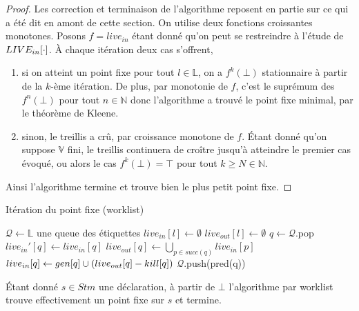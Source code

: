 \documentclass[a4paper, 10pt]{article}
\begin{document}
\begin{proof}
Les correction et terminaison de l'algorithme reposent en partie sur ce qui a été dit en amont de cette section.
On utilise deux fonctions croissantes monotones. Posons $f = live_{in}$ étant donné qu'on peut se restreindre
à l'étude de $LIVE_{in}[\cdot]$. À chaque itération deux cas s'offrent,
\begin{enumerate}
	\item si on atteint un point fixe pour tout $l \in \mathbb{L}$, on a $f^k(\bot)$ stationnaire
	à partir de la $k$-ème itération. De plus, par monotonie de $f$, c'est le suprémum des $f^n(\bot)$ pour tout $n \in \mathbb{N}$ donc
	l'algorithme a trouvé le point fixe minimal, par le théorème de Kleene.
	\item sinon, le treillis a crû, par croissance monotone de $f$. Étant donné qu'on suppose $\mathbb{V}$ fini, le treillis continuera
	de croître jusqu'à atteindre le premier cas évoqué, ou alors le cas $f^k(\bot) = \top$ pour tout $k \ge N \in \mathbb{N}$.
\end{enumerate}
Ainsi l'algorithme termine et trouve bien le plus petit point fixe.
\end{proof}
\begin{algorithm}[H]
	\caption{Itération du point fixe (worklist)}
	\begin{algorithmic}
		\State $\mathcal{Q} \leftarrow \mathbb{L}$ une queue des étiquettes
		\State $live_{in}[l] \leftarrow \emptyset$
		\State $live_{out}[l] \leftarrow \emptyset$
		\EndFor
		\State $q \leftarrow \mathcal{Q}$.pop
		\State $live_{in}'[q] \leftarrow live_{in}[q]$
		\State $live_{out}[q] \leftarrow \bigcup\limits_{p\in succ(q)} live_{in}[p]$
		\State $live_{in}[q] \leftarrow gen[q] \cup (live_{out}[q] - kill[q])$
		\State $\mathcal{Q}$.push(pred(q))
		\EndIf
		\EndWhile
	\end{algorithmic}
\end{algorithm}
\noindent
\begin{lemma}
	Étant donné $s \in Stm$ une déclaration, à partir de $\bot$ l'algorithme par worklist trouve effectivement
	un point fixe sur $s$ et termine.
\end{lemma}
\\
\end{document}
